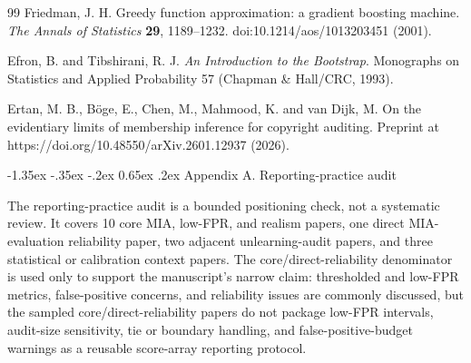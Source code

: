 \documentclass[
  10pt,
  twocolumn]{article}
\begin{document}
\begin{thebibliography}{99}
Friedman, J. H.
Greedy function approximation: a gradient boosting machine.
\emph{The Annals of Statistics} \textbf{29}, 1189--1232.
doi:10.1214/aos/1013203451 (2001).

Efron, B. and Tibshirani, R. J.
\emph{An Introduction to the Bootstrap}.
Monographs on Statistics and Applied Probability 57 (Chapman \& Hall/CRC, 1993).

Ertan, M. B., B{\"o}ge, E., Chen, M., Mahmood, K. and van Dijk, M.
On the evidentiary limits of membership inference for copyright auditing.
Preprint at https://doi.org/10.48550/\allowbreak{}arXiv.2601.12937 (2026).

\end{thebibliography}

\newpage

\makeatletter
\renewcommand\section{\@startsection{section}{1}{\z@}%
  {-1.35ex \@plus -.35ex \@minus -.2ex}%
  {0.65ex \@plus .2ex}%
  {\normalfont\large\bfseries}}
\makeatother

\setcounter{table}{0}
\renewcommand{\thetable}{A\arabic{table}}
\renewcommand{\theHtable}{appendix.\arabic{table}}
\setcounter{figure}{0}
\renewcommand{\thefigure}{A\arabic{figure}}
\renewcommand{\theHfigure}{appendix.\arabic{figure}}

\hypertarget{appendix-a-reporting-practice-mini-audit}{%
\section{Appendix A. Reporting-practice audit}\label{appendix-a-reporting-practice-mini-audit}}

The reporting-practice audit is a bounded positioning check, not a systematic review. It covers 10 core MIA, low-FPR, and realism papers, one direct MIA-evaluation reliability paper, two adjacent unlearning-audit papers, and three statistical or calibration context papers. The core/direct-reliability denominator is used only to support the manuscript's narrow claim: thresholded and low-FPR metrics, false-positive concerns, and reliability issues are commonly discussed, but the sampled core/direct-reliability papers do not package low-FPR intervals, audit-size sensitivity, tie or boundary handling, and false-positive-budget warnings as a reusable score-array reporting protocol.
\end{document}
